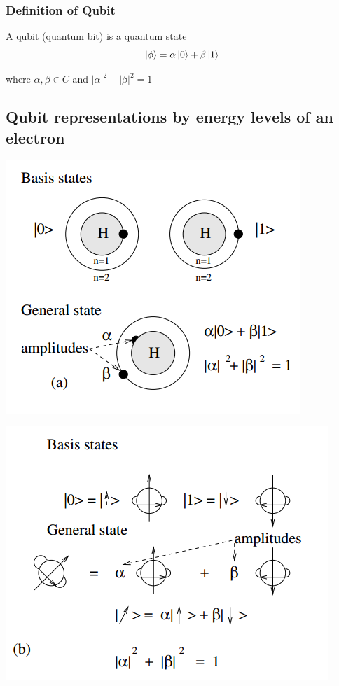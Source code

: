 \documentclass[12pt]{book}
\begin{document}
\subsubsection{Definition of Qubit}
A qubit (quantum bit) is a quantum state
$$
\ket{\phi} = \alpha\ket{0} + \beta\ket{1}
$$

where $\alpha, \beta \in C$ and $|\alpha|^{2} + |\beta|^{2} = 1$


\subsection{Qubit representations by energy levels of an electron}

\begin{center}
	\includegraphics[scale=.8]{./qubit_1.png}
\end{center}


\begin{center}
	\includegraphics[scale=.8]{./qubit_2.png}
\end{center}
\end{document}
